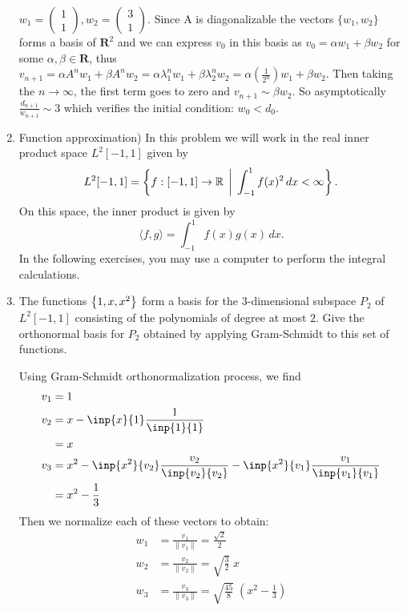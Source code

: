 \documentclass[10pt]{article}
\begin{document}
\begin{enumerate}
$w_1=\begin{pmatrix} 1 \\ 1 \end{pmatrix}, w_2 = \begin{pmatrix} 3 \\ 1 \end{pmatrix}$. Since A is diagonalizable the vectors $\{w_1, w_2\}$ forms a basis of $\mathbf{R}^2$ 
and we can express $v_0$ in this basis as $v_0 = \alpha w_1 + \beta w_2$ for some $\alpha,\beta \in \mathbf{R}$, 
thus $v_{n+1} = \alpha A^n w_1 + \beta A^n w_2 = \alpha \lambda_1^n w_1 + \beta \lambda_2^n w_2 = \alpha (\frac{1}{2^n}) w_1 + \beta w_2$. Then taking the $n\to\infty$, the first term goes to zero and $v_{n+1} \sim \beta w_2$. So asymptotically $\frac{d_{n+1}} {w_{n+1}} \sim 3$ which verifies the initial condition: $w_0 < d_0$. 
 
\item Function approximation) In this problem we will work in the real inner product space
  $L^2[-1,1]$ given by
  $$L^2[-1,1] = \left\{f:[-1,1]\to\mathbb{R}\,\biggm|\, \int_{-1}^1 f(x)^2\,dx <
  \infty\right\}.$$
  On this space, the inner product is given by
  $$\langle f,g\rangle = \int_{-1}^1 f(x)g(x)\,dx.$$
  In the following exercises, you may use a computer to perform the integral calculations.

\be
	\item  The functions $\left\{ 1,x,x^2 \right\}$ form a basis for the 3-dimensional
    subspace $P_2$
    of $L^2[-1,1]$ consisting of the polynomials of degree at most $2$.
    Give the orthonormal basis for $P_2$ obtained by applying
    Gram-Schmidt to this set of functions.
    
    Using Gram-Schmidt orthonormalization process, we find
	\begin{align*}
		v_1 	&=	1 \\
		v_2	&= 	x - \inp{x}{1} \frac{1}{\inp{1}{1}} \\
			&= 	x \\
		v_3 	&= 	x^2 -  \inp{x^2}{v_2} \frac{v_2} {\inp{v_2} {v_2}} - \inp{x^2}{v_1} \frac{v_1}{\inp{v_1} {v_1}} \\
			&= x^2 - \frac{1}{3}
	\end{align*}
	Then we normalize each of these vectors to obtain:
	\begin{align*}
		w_1 &=	\frac{v_1}{\|v_1\|}	= \frac{\sqrt{2}}{2} \\
		w_2	&=	\frac{v_2}{\|v_2\|}	= \sqrt{\frac{3}{2}} \; x \\
		w_3	&=	\frac{v_3}{\|v_3\|}	= \sqrt{\frac{45}{8}} \; (x^2 - \frac{1}{3})
	\end{align*}


\end{enumerate}
\end{document}
